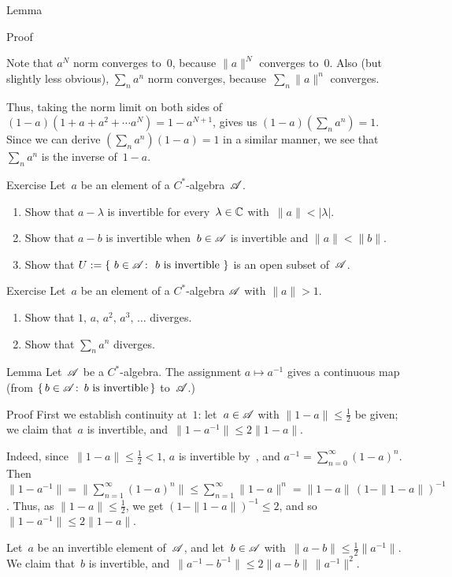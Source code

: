 \documentclass[main]{subfiles}
\begin{document}
\begin{parsec}
\begin{point}[geometric]{Lemma}
\begin{point}{Proof}
\begin{point}%
Note that $a^N$ norm converges to~$0$,
because $\|a\|^N$ converges to~$0$.
Also (but slightly less obvious),
$\sum_n a^n$ norm converges,
because~$\sum_n \|a\|^n$ converges.
\end{point}
\begin{point}%
Thus, taking the norm limit
on both sides of $(1-a)(1+a+a^2+\dotsb a^N) = 1-a^{N+1}$,
gives us $(1-a)(\sum_n a^n) = 1$.
Since we can derive $(\sum_n a^n)(1-a) = 1$
in a similar manner, 
we see that $\sum_n a^n$ is the inverse of~$1-a$.
\end{point}
\end{point}
\end{point}
\begin{point}{Exercise}
Let~$a$ be an element of a $C^*$-algebra~$\mathscr{A}$.
\begin{enumerate}
\item
Show that $a-\lambda$ is invertible
for every~$\lambda\in\mathbb{C}$ with~$\|a\|< \left|\lambda\right|$.
\item
Show that $a-b$ is invertible
when~$b\in\mathscr{A}$ is invertible and $\|a\| < \|b\|$.
\item
Show that $U:=\{\ b\in\scrA\colon\ \text{$b$ is invertible}\ \}$
is an open subset of~$\mathscr{A}$.
\end{enumerate}
\end{point}
\begin{point}{Exercise}%
Let~$a$ be an element of a $C^*$-algebra $\mathscr{A}$ with $\|a\|>1$.
\begin{enumerate}
\item
Show that $1,\,a,\,a^2,\,a^3,\,\dotsc$ diverges.
\item
Show that $\sum_n a^n$ diverges.
\end{enumerate}
\end{point}
\begin{point}{Lemma}%
Let~$\mathscr{A}$ be a $C^*$-algebra.
The assignment $a\mapsto a^{-1}$
gives a  continuous map
(from $\{\,b\in \mathscr{A}\colon\, \text{$b$ is invertible}\,\}$
to~$\mathscr{A}$.)
\begin{point}{Proof}
First we establish continuity at~$1$:
let~$a\in\mathscr{A}$ with $\|1-a\|\leq \frac{1}{2}$ be given;
we claim that~$a$ is invertible,
and~$\|1-a^{-1}\| \leq 2\|1-a\|$.

Indeed, since~$\|1-a\|\leq \frac{1}{2}<1$,
$a$ is invertible by~,
and $a^{-1}=\sum_{n=0}^\infty (1-a)^n$.
Then~$\|1-a^{-1}\|=\|\sum_{n=1}^\infty (1-a)^n\|\leq \sum_{n=1}^\infty \|1-a\|^n
= \|1-a\|\, (1-\|1-a\|)^{-1}$.
Thus, as $\|1-a\|\leq\frac{1}{2}$,
we get $(1-\|1-a\|)^{-1}\leq 2$,
and so $\|1-a^{-1}\|\leq 2\|1-a\|$.
\begin{point}%
Let~$a$ be an invertible element of~$\mathscr{A}$,
and let~$b\in\mathscr{A}$ with~$\|a-b\|\leq\frac{1}{2}\|a^{-1}\|$.
We claim that~$b$ is invertible,
and~$\|a^{-1}-b^{-1}\|\leq 2\|a-b\|\,\|a^{-1}\|^2$.


\end{point}
\end{point}
\end{point}
\end{parsec}
\end{document}
